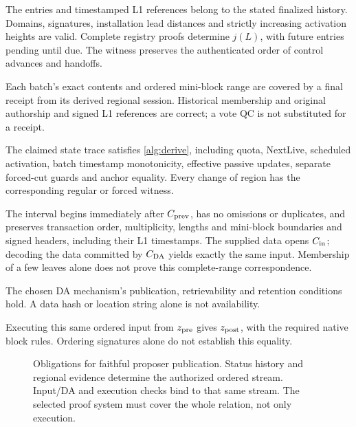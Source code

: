 \documentclass[11pt,a4paper,onecolumn]{article}
\begin{document}
\begin{description}[style=nextline,leftmargin=1em,labelindent=0pt]
\item[$\mathcal R_{\rm registry}$: authenticated control.]
The entries and timestamped L1 references belong to the stated finalized
history. Domains, signatures, installation lead distances and strictly
increasing activation heights are valid. Complete registry proofs
determine $j(L)$, with future entries pending until due. The witness
preserves the authenticated order of control advances and handoffs.
\item[$\mathcal R_{\rm source}$: regional consensus.]
Each batch's exact contents and ordered mini-block range are covered by a
final receipt from its derived regional session. Historical membership and
original authorship and signed L1 references are correct; a vote QC is not
substituted for a receipt.
\item[$\mathcal R_{\rm rotation}$: authorized succession.]
The claimed state trace satisfies \cref{alg:derive}, including quota,
NextLive, scheduled activation, batch timestamp monotonicity, effective
passive updates, separate forced-cut guards and anchor equality.
Every change of region has the corresponding regular or forced witness.
\item[$\mathcal R_{\rm input}$: faithful ordered data.]
The interval begins immediately after $C_{\rm prev}$, has no omissions or
duplicates, and preserves transaction order, multiplicity, lengths and
mini-block boundaries and signed headers, including their L1 timestamps.
The supplied data opens $C_{\rm in}$; decoding the
data committed by $C_{\rm DA}$ yields exactly the same input. Membership
of a few leaves alone does not prove this complete-range correspondence.
\item[$\mathcal R_{\rm DA}$: availability.]
The chosen DA mechanism's publication, retrievability and retention
conditions hold. A data hash or location string alone is not availability.
\item[$\mathcal R_{\rm exec}$: execution.]
Executing this same ordered input from $z_{\rm pre}$ gives $z_{\rm post}$,
with the required native block rules. Ordering signatures alone do not
establish this equality.
\end{description}

\begin{figure}[htbp]\centering

\caption{Obligations for faithful proposer publication. Status history and
regional evidence determine the authorized ordered stream. Input/DA and
execution checks bind to that same stream. The selected proof system must
cover the whole relation, not only execution.}
\label{fig:derivation}
\end{figure}
\end{document}
